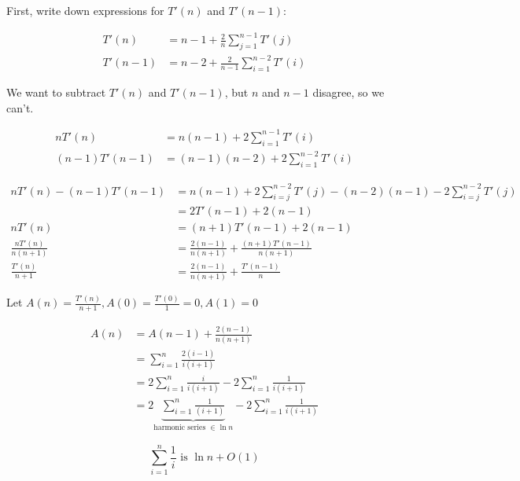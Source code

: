 \noindent First, write down expressions for $T'(n)$ and $T'(n-1)$:

\begin{equation*}
\begin{split}
T'(n) & = n-1 + \frac{2}{n} \sum_{j=1}^{n-1} T'(j) \\
T'(n-1) & = n-2 + \frac{2}{n-1} \sum_{i=1}^{n-2} T'(i) 
\end{split}
\end{equation*}

\noindent We want to subtract $T'(n)$ and $T'(n-1)$, but $n$ and $n-1$ disagree, so we can't.

\begin{equation*}
\begin{split}
nT'(n) & = n(n-1) + 2\sum_{i=1}^{n-1} T'(i) \\
(n-1)T'(n-1) & = (n-1)(n-2) + 2\sum_{i=1}^{n-2} T'(i)
\end{split}
\end{equation*}

\begin{equation*}
\begin{split}
nT'(n) - (n-1)T'(n-1) & = n(n-1) + 2 \sum_{i=j}^{n-2} T'(j) - (n-2)(n-1)  - 2\sum_{i=j}^{n-2} T'(j) \\
& = 2T'(n-1) + 2(n-1) \\
nT'(n) & = (n+1)T'(n-1) + 2(n-1) \\
\frac{nT'(n)}{n(n+1)} & = \frac{2(n-1)}{n(n+1)} + \frac{(n+1)T'(n-1)}{n(n+1)} \\
\frac{T'(n)}{n+1} & = \frac{2(n-1)}{n(n+1)} + \frac{T'(n-1)}{n}
\end{split}
\end{equation*}

\noindent Let $A(n) = \frac{T'(n)}{n+1}, A(0) = \frac{T'(0)}{1} = 0, A(1) = 0$

\begin{equation*}
\begin{split}
A(n) & = A(n-1) + \frac{2(n-1)}{n(n+1)} \\
& = \sum_{i=1}^n \frac{2(i-1)}{i(i+1)} \\
& = 2 \sum_{i=1}^n \frac{i}{i(i+1)} - 2 \sum_{i=1}^n \frac{1}{i(i+1)} \\
& = 2 \underbrace{\sum_{i=1}^n \frac{1}{(i+1)}}_{\textrm{harmonic series } \in \ln n} - 2 \sum_{i=1}^n \frac{1}{i(i+1)}
\end{split}
\end{equation*}

$$ \sum_{i=1}^n \frac{1}{i} \textrm{ is } \ln n + O(1)$$

